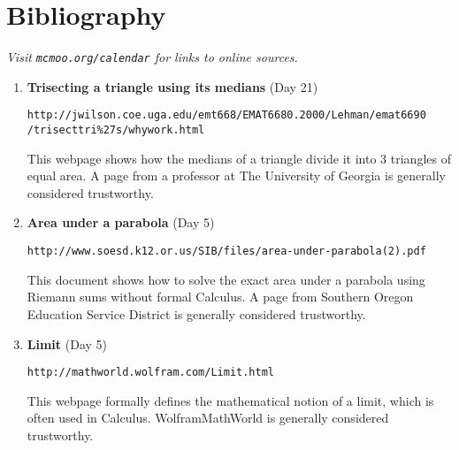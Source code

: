 \documentclass[letterpaper,12pt]{article}
\begin{document}
	\pagestyle{fancy}
	
		\section*{Bibliography} \textit{Visit \texttt{mcmoo.org/calendar} for links to online sources.}
	
	\vspace{1cm}
		\begin{enumerate}
			\item \textbf{Trisecting a triangle using its medians} (Day 21) \par\texttt{http://jwilson.coe.uga.edu/emt668/EMAT6680.2000/Lehman/emat6690\\/trisecttri\%27s/whywork.html}\par This webpage shows how the medians of a triangle divide it into 3 triangles of equal area. A page from a professor at The University of Georgia is generally considered trustworthy.
			
			\item \textbf{Area under a parabola} (Day 5)
			\par\texttt{http://www.soesd.k12.or.us/SIB/files/area-under-parabola(2).pdf}\par This document shows how to solve the exact area under a parabola using Riemann sums without formal Calculus. A page from Southern Oregon Education Service District is generally considered trustworthy.
			
			\item \textbf{Limit} (Day 5)
			\par\texttt{http://mathworld.wolfram.com/Limit.html}\par This webpage formally defines the mathematical notion of a limit, which is often used in Calculus. WolframMathWorld is generally considered trustworthy.
		\end{enumerate}
\end{document}
